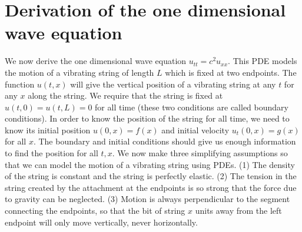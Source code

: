 \section{Derivation of the one dimensional wave equation}
We now derive the one dimensional wave equation $u_{tt}=c^2u_{xx}$.  This PDE models the motion of a vibrating string of length $L$ which is fixed at two endpoints.  The function $u(t,x)$ will give the vertical position of a vibrating string at any $t$ for any $x$ along the string.  We require that the string is fixed at $u(t,0)=u(t,L) = 0$ for all time (these two conditions are called boundary conditions). In order to know the position of the string for all time, we need to know its initial position $u(0,x) = f(x)$ and initial velocity $u_t(0,x)=g(x)$ for all $x$.  The boundary and initial conditions should give us enough information to find the position for all $t,x$.  We now make three simplifying assumptions so that we can model the motion of a vibrating string using PDEs. (1) The density of the string is constant and the string is perfectly elastic. (2) The tension in the string created by the attachment at the endpoints is so strong that the force due to gravity can be neglected. (3) Motion is always perpendicular to the segment connecting the endpoints, so that the bit of string $x$ units away from the left endpoint will  only move vertically, never horizontally.

